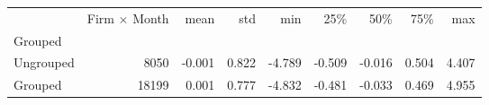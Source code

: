 \begin{tabular}{lrrrrrrrr}
\toprule
{} &  Firm $\times$ Month &   mean &    std &    min &    25\% &    50\% &    75\% &    max \\
Grouped   &                     &        &        &        &        &        &        &        \\
\midrule
Ungrouped &                8050 & -0.001 &  0.822 & -4.789 & -0.509 & -0.016 &  0.504 &  4.407 \\
Grouped   &               18199 &  0.001 &  0.777 & -4.832 & -0.481 & -0.033 &  0.469 &  4.955 \\
\bottomrule
\end{tabular}
